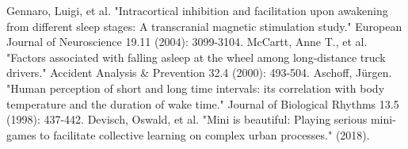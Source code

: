 \documentclass[a4paper, 11pt]{article}
\begin{document}
\begin{thebibliography}{9}
 Gennaro, Luigi, et al. "Intracortical inhibition and facilitation upon awakening from different sleep stages: A transcranial magnetic stimulation study." European Journal of Neuroscience 19.11 (2004): 3099-3104.
 McCartt, Anne T., et al. "Factors associated with falling asleep at the wheel among long-distance truck drivers." Accident Analysis & Prevention 32.4 (2000): 493-504.
 Aschoff, Jürgen. "Human perception of short and long time intervals: its correlation with body temperature and the duration of wake time." Journal of Biological Rhythms 13.5 (1998): 437-442.
 Devisch, Oswald, et al. "Mini is beautiful: Playing serious mini-games to facilitate collective learning on complex urban processes." (2018).
\end{thebibliography}

\listoffigures	%
\end{document}

